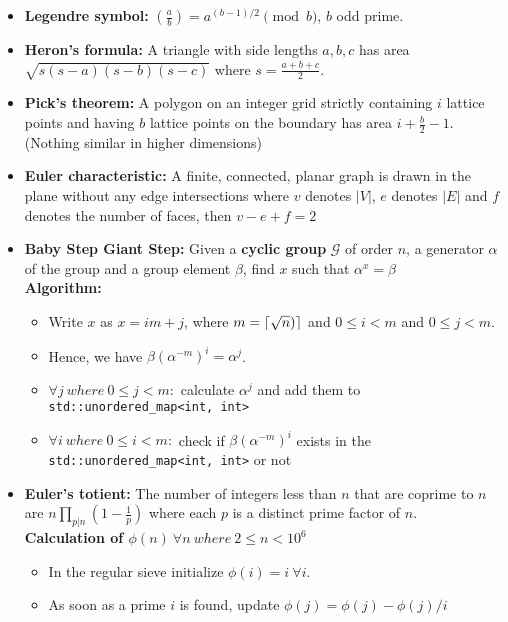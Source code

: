 \documentclass[15pt,a4paper]{article}
\DeclarePairedDelimiter{\ceil}{\lceil}{\rceil}
\begin{document}
\begin{landscape}
\begin{multicols*}{3}
\begin{itemize}
    \item \textbf{Legendre symbol:} $\left(\frac{a}{b}\right) = a^{(b-1)/2} \pmod{b}$, $b$ odd prime.
    \item \textbf{Heron's formula:} A triangle with side lengths
    $a,b,c$ has area $\sqrt{s(s-a)(s-b)(s-c)}$ where $s =
    \frac{a+b+c}{2}$.
    \item \textbf{Pick's theorem:} A polygon on an integer grid
    strictly containing $i$ lattice points and having $b$ lattice
    points on the boundary has area $i + \frac{b}{2} - 1$. (Nothing
    similar in higher dimensions)
    \item \textbf{Euler characteristic:} A finite, connected, planar graph is drawn in the plane without any edge intersections where $v$ denotes $|V|$, $e$ denotes $|E|$ and $f$ denotes the number of faces, then $v - e + f = 2$
    \item \textbf{Baby Step Giant Step:} Given a \textbf{cyclic group} $\mathcal{G}$ of order $n$, a generator $\alpha$ of the group and a group element $\beta$, find $x$ such that $\alpha^x = \beta$\\
        \textbf{Algorithm: }\begin{itemize}
            \item Write $x$ as $x = im + j$, where $m = \ceil{\sqrt{n})}$ and $0 \leq i < m$ and $0 \leq j < m$.
            \item Hence, we have $\beta(\alpha^{-m})^{i} = \alpha^j$.
            \item $\forall j\ where\ 0 \leq j < m:$ calculate $\alpha^j$ and add them to \verb!std::unordered_map<int, int>!
            \item $\forall i\ where\ 0 \leq i < m:$ check if $\beta(\alpha^{-m})^{i}$ exists in the \verb|std::unordered_map<int, int>| or not
        \end{itemize}
    \item \textbf{Euler's totient:} The number of integers less than
    $n$ that are coprime to $n$ are $n\prod_{p|n}\left(1 - \frac{1}{p}\right)$
    where each $p$ is a distinct prime factor of $n$.\\
    \textbf{Calculation of $\phi(n)\ \forall n\ where\ 2 \leq n < 10^6$}
        \begin{itemize}
            \item In the regular sieve initialize $\phi(i) = i\ \forall i$.
            \item As soon as a prime $i$ is found, update $\phi(j) = \phi(j) - \phi(j)/i$

\end{itemize}
\end{itemize}
\end{multicols*}
\end{landscape}
\end{document}
